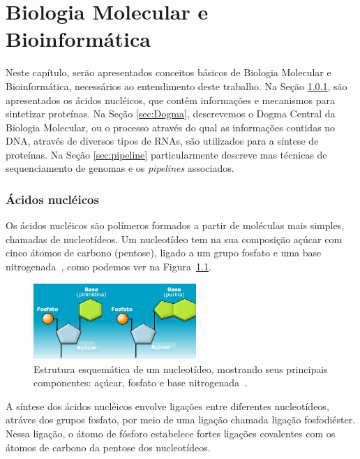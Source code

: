\chapter{Biologia Molecular e Bioinformática}
\label{sec:BiologiaMolecularBioInformática}

Neste capítulo, serão apresentados conceitos básicos de Biologia Molecular e Bioinformática, necessários ao entendimento deste trabalho. Na Seção \ref{sec:AcidosNucleicos}, são apresentados os ácidos nucléicos, que contêm informações e mecanismos para sintetizar proteínas. Na Seção \ref{sec:Dogma}, descrevemos o Dogma Central da Biologia Molecular, ou o processo através do qual as informações contidas no DNA, através de diversos tipos de RNAs, são utilizados para a síntese de proteínas. Na Seção \ref{sec:pipeline} particularmente descreve mas técnicas de sequenciamento de genomas e os \textit{pipelines} associados.


\subsection{Ácidos nucléicos} \label{sec:AcidosNucleicos}

Os ácidos nucléicos são polímeros formados a partir de moléculas mais simples, chamadas de nucleotídeos. Um nucleotídeo tem na sua composição açúcar com cinco átomos de carbono (pentose), ligado a um grupo fosfato e uma base nitrogenada~\citep{koolman:2005}, como podemos ver na Figura~\ref{fig:AcidosNucleicos}.

\begin{figure}[ht]
\centering
\includegraphics[angle=0,width=0.55\textwidth]{imagens//AcidosNucleicos.jpg}
\caption{Estrutura esquemática de um nucleotídeo, mostrando seus principais componentes: açúcar, fosfato e base nitrogenada~\citep{brainstuff:2000}. \label{fig:AcidosNucleicos}}
\end{figure}

A síntese dos ácidos nucléicos envolve ligações entre diferentes nucleotídeos, atráves dos grupos fosfato, por meio de uma ligação chamada ligação fosfodiéster. Nessa ligação, o átomo de fósforo estabelece fortes ligações covalentes com os átomos de carbono da pentose dos nucleotídeos.


